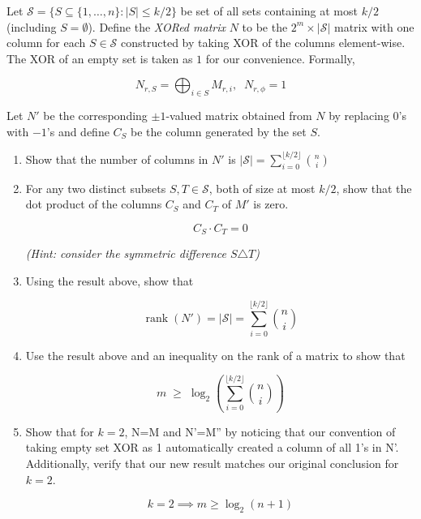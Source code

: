 \begin{enumerate}
\noindent Let $\mathcal S = \{S \subseteq \{1,\dots,n\} : |S|\leq k/2\}$ be set of all sets containing at most 
$k/2$ (including $S=\emptyset$). Define the \emph{XORed matrix} $N$ to be the 
$2^m \times |\mathcal S|$ matrix with one column for each 
$S \in \mathcal S$ constructed by taking XOR of the columns element-wise. The XOR of an empty 
set is taken as $1$ for our convenience. Formally, 

\[
N_{r,S} = \bigoplus_{i \in S} M_{r,i}, \;\; N_{r,\phi}=1
\]

Let $N'$ be the corresponding $\pm 1$-valued matrix obtained from $N$ by replacing $0$'s with $-1$'s and define 
$C_S$ be the column generated by the set $S$.

\begin{enumerate}[label=\textbf{(\alph*)}]

\item Show that the number of columns in $N'$ is $|\mathcal S|= \sum\limits_{i=0}^{\lfloor k/2 \rfloor} \binom{n}{i}$

\item For any two distinct subsets $S,T \in \mathcal S$, both of size at most $k/2$, show that the 
dot product of the columns $C_S$ and $C_T$ of $M'$ is zero.

\[
C_S \cdot C_T = 0
\]

\emph{(Hint: consider the symmetric difference $S \triangle T$)}

\item Using the result above, show that

\[
\operatorname{rank}(N') = |\mathcal S| = \sum_{i=0}^{\lfloor k/2 \rfloor} \binom{n}{i}
\]

\item Use the result above and an inequality on the rank of a matrix to show that

\[
m \;\geq\; \log_2 \left( \sum_{i=0}^{\lfloor k/2 \rfloor} \binom{n}{i} \right)
\]

\item Show that for $k=2$, N=M and N'=M'' by noticing that our convention of taking empty set XOR as 1 
automatically created a column of all 1's in N'. Additionally, verify that our new result matches our original 
conclusion for $k=2$.

\[
k=2 \implies m \ge \log_2(n+1)
\]

\end{enumerate}
\end{enumerate}